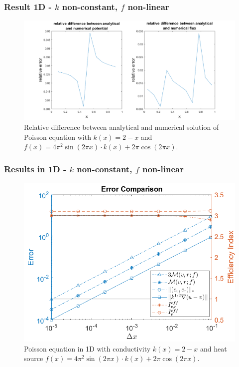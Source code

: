\documentclass[t]{beamer}
\begin{document}
\begin{frame}
\frametitle{Result 1D - $k$ non-constant, $f$ non-linear}
\begin{figure}
\vspace{-5pt}
\centering
\includegraphics[width = 1.0\linewidth, left]{difference_analytical_numerical.png}
\caption{Relative difference between analytical and numerical solution of Poisson equation with $k(x) = 2-x$ and $f(x) = 4\pi^2\sin(2\pi x)\cdot k(x) + 2\pi\cos(2\pi x)$.}
\label{fig:fig:diff}
\end{figure}
\end{frame}

\begin{frame}
\frametitle{Results in 1D - $k$ non-constant, $f$ non-linear}
\vspace{-18pt}
\begin{figure}[t]
\centering
\includegraphics[width = 0.7\linewidth]{convergenceplot_k_f_non_constant.png}
\caption{Poisson equation in 1D with conductivity $k(x) = 2-x$ and heat source $f(x) = 4\pi^2\sin(2\pi x)\cdot k(x) + 2\pi\cos(2\pi x)$.}
\label{fig:Convergence1d}
\end{figure}

\end{frame}
\end{document}
